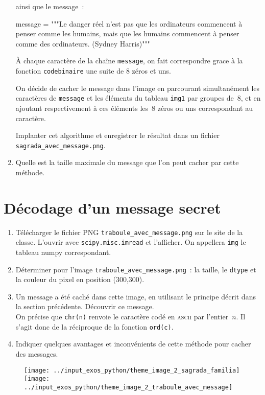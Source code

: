 \begin{enumerate}
  ainsi que le message~: 

  \begin{python}
message = """Le danger réel n'est pas que les ordinateurs commencent à penser comme les humains,
mais que les humains commencent à penser comme des ordinateurs. 
(Sydney Harris)"""    
  \end{python}

  À chaque caractère de la chaîne \texttt{message}, on fait
  correspondre grace à la fonction \texttt{codebinaire} une
  suite de 8 zéros et uns. 

  On décide de cacher le message dans l'image en parcourant
  simultanément les caractères de \texttt{message} et les
  éléments du tableau \texttt{img1} par groupes de~8, et en
  ajoutant respectivement à ces éléments les~8 zéros ou uns
  correspondant au caractère. 

  Implanter cet algorithme et enregistrer le résultat dans un fichier
  \verb#sagrada_avec_message.png#.

\item 
  Quelle est la taille maximale du message que l'on peut cacher par
  cette méthode. 
\end{enumerate}


\section{Décodage d'un message secret}

\begin{enumerate}[resume*]
\item 
  Télécharger le fichier PNG \texttt{traboule\_avec\_message.png}
  sur le site de la classe. L'ouvrir avec \texttt{scipy.misc.imread} et l'afficher. On
  appellera \texttt{img} le tableau numpy correspondant.


\item 
  Déterminer pour l'image \texttt{traboule\_avec\_message.png}~: la taille, le
  \texttt{dtype} et la couleur du  pixel en position (300,300). 

\item 
  Un message a été caché dans cette image, en utilisant le principe
  décrit dans la section précédente. Découvrir ce message. \\
  On précise que \verb#chr(n)# renvoie le caractère codé en
  \textsc{ascii} par l'entier~$n$. Il s'agit donc de la réciproque de
  la fonction \verb#ord(c)#.

\item 
  Indiquer quelques avantages et inconvénients de cette méthode pour
  cacher des messages. 
\end{enumerate}




\begin{figure}[h]
  \centering
  \texttt{[image: ../input\_exos\_python/theme\_image\_2\_sagrada\_familia]}
  \hspace*{.1\textwidth}
  \texttt{[image: ../input\_exos\_python/theme\_image\_2\_traboule\_avec\_message]}
\end{figure}


